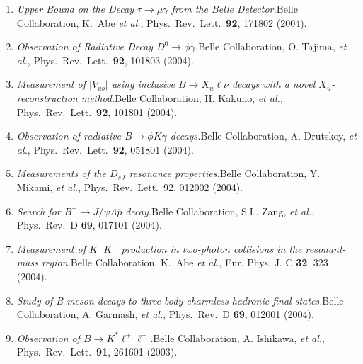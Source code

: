 \documentclass[10pt,a4paper]{article}
\def\pub#1#2#3{{\it #1.}\newline #2, #3.}
\def\cited#1{Cited $\ge$ #1}
\def\PRL{Phys.\ Rev.\ Lett.\ }
\def\PRD{Phys.\ Rev.\ D }
\def\etal{{\it et al.}}
\def\belle{Belle Collaboration, K.~Abe \etal }
\begin{document}
\begin{enumerate}
\item
\pub{Upper Bound on the Decay $\tau \to \mu \gamma$ from the Belle Detector}
{\belle}
{\PRL {\bf 92}, 171802 (2004)}

\item
\pub{Observation of Radiative Decay $D^0 \to \phi \gamma$}
{Belle Collaboration, O. Tajima, \etal}
{\PRL {\bf 92}, 101803 (2004)}

\item
\pub{Measurement of $|V_{ub}|$ using inclusive $B \to X_u \ell \nu$ decays with a novel $X_u$-reconstruction method}
{Belle Collaboration, H. Kakuno, \etal}
{\PRL {\bf 92}, 101801 (2004)}

\item
\pub{Observation of radiative $B \to \phi K \gamma$ decays}
{Belle Collaboration, A. Drutskoy, \etal}
{\PRL {\bf 92}, 051801 (2004)}

\item
\pub{Measurements of the $D_{sJ}$ resonance properties}
{Belle Collaboration, Y. Mikami, \etal}
{\PRL {\b 92}, 012002 (2004)}

\item
\pub{Search for $B^- \to J/\psi \Lambda \overline{p}$ decay}
{Belle Collaboration, S.L. Zang, \etal}
{\PRD {\bf 69}, 017101 (2004)}

\item
\pub{Measurement of $K^+ K^-$ production in two-photon collisions in the resonant-mass region}
{\belle}
{Eur. Phys. J. C {\bf 32}, 323 (2004)}

\item
\pub{Study of B meson decays to three-body charmless hadronic final states}
{Belle Collaboration, A. Garmash, \etal}
{\PRD {\bf 69}, 012001 (2004)}


\item
\pub{Observation of $B \to K^* \ell^+ \ell^-$}
{Belle Collaboration, A. Ishikawa, \etal}
{\PRL {\bf 91}, 261601 (2003)}


\end{enumerate}
\end{document}
